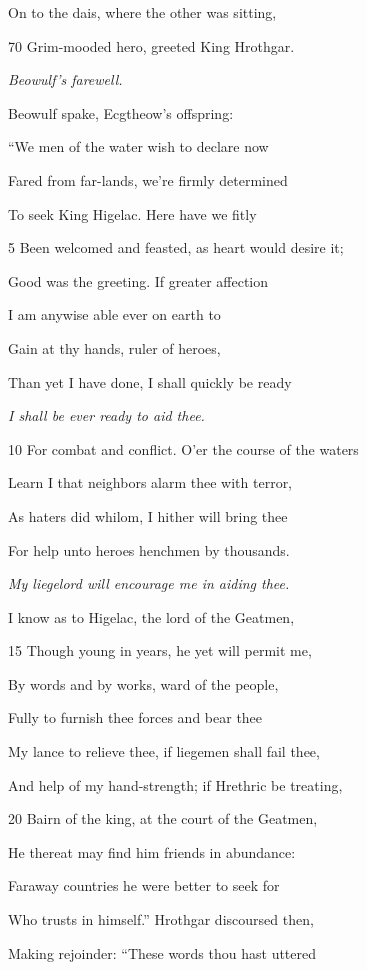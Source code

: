 On to the dais, where the other was sitting,

70
Grim-mooded hero, greeted King Hrothgar.



\emph{Beowulf’s farewell.}

Beowulf spake, Ecgtheow’s offspring:

“We men of the water wish to declare now

Fared from far-lands, we’re firmly determined

To seek King Higelac. Here have we fitly

5
Been welcomed and feasted, as heart would desire it;

Good was the greeting. If greater affection

I am anywise able ever on earth to

Gain at thy hands, ruler of heroes,

Than yet I have done, I shall quickly be ready

\emph{I shall be ever
ready to aid thee.}

10
For combat and conflict. O’er the course of the waters

Learn I that neighbors alarm thee with terror,

As haters did whilom, I hither will bring thee

For help unto heroes henchmen by thousands.

\emph{My liegelord will
encourage me in
aiding thee.}

I know as to Higelac, the lord of the Geatmen,

15
Though young in years, he yet will permit me,

By words and by works, ward of the people,

Fully to furnish thee forces and bear thee

My lance to relieve thee, if liegemen shall fail thee,

And help of my hand-strength; if Hrethric be treating,

20
Bairn of the king, at the court of the Geatmen,

He thereat may find him friends in abundance:

Faraway countries he were better to seek for

Who trusts in himself.” Hrothgar discoursed then,

Making rejoinder: “These words thou hast uttered

